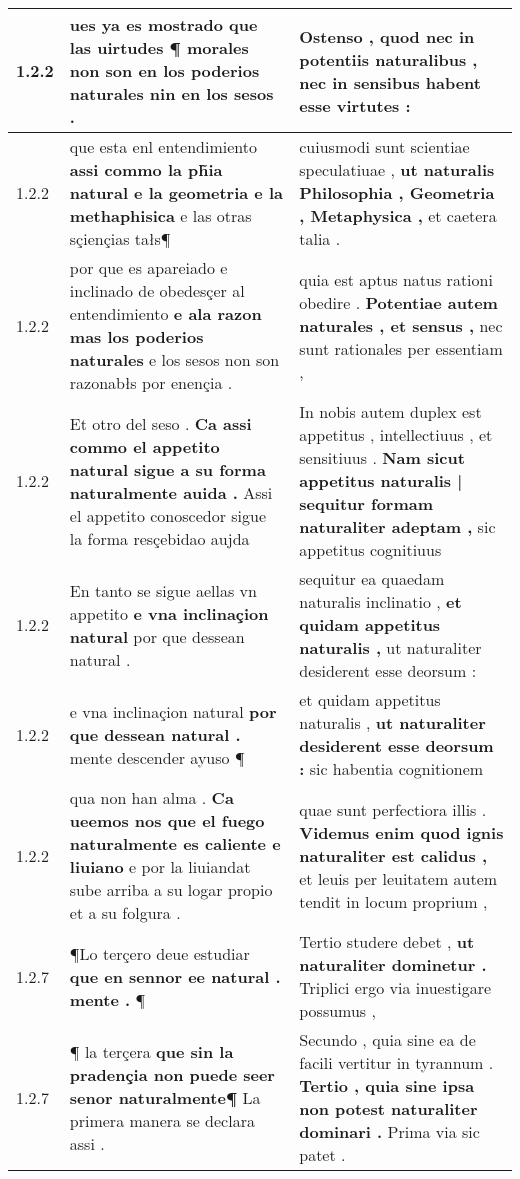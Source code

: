 \begin{tabular}{|p{1cm}|p{6.5cm}|p{6.5cm}|}
1.2.2 & ues ya es mostrado \textbf{ que las uirtudes ¶ morales non son en los poderios naturales } nin en los sesos . & Ostenso , \textbf{ quod nec in potentiis naturalibus , } nec in sensibus habent esse virtutes : \\\hline
1.2.2 & que esta enl entendimiento \textbf{ assi commo la ph̃ia natural e la geometria e la methaphisica } e las otras sçiençias tałs¶ & cuiusmodi sunt scientiae speculatiuae , \textbf{ ut naturalis Philosophia , Geometria , Metaphysica , } et caetera talia . \\\hline
1.2.2 & por que es apareiado e inclinado de obedesçer al entendimiento \textbf{ e ala razon mas los poderios naturales } e los sesos non son razonabłs por enençia . & quia est aptus natus rationi obedire . \textbf{ Potentiae autem naturales , et sensus , } nec sunt rationales per essentiam , \\\hline
1.2.2 & Et otro del seso . \textbf{ Ca assi commo el appetito natural sigue a su forma naturalmente auida . } Assi el appetito conoscedor sigue la forma resçebidao aujda & In nobis autem duplex est appetitus , intellectiuus , et sensitiuus . \textbf{ Nam sicut appetitus naturalis | sequitur formam naturaliter adeptam , } sic appetitus cognitiuus \\\hline
1.2.2 & En tanto se sigue aellas vn appetito \textbf{ e vna inclinaçion natural } por que dessean natural . & sequitur ea quaedam naturalis inclinatio , \textbf{ et quidam appetitus naturalis , } ut naturaliter desiderent esse deorsum : \\\hline
1.2.2 & e vna inclinaçion natural \textbf{ por que dessean natural . } mente descender ayuso ¶ & et quidam appetitus naturalis , \textbf{ ut naturaliter desiderent esse deorsum : } sic habentia cognitionem \\\hline
1.2.2 & qua non han alma . \textbf{ Ca ueemos nos que el fuego naturalmente es caliente e liuiano } e por la liuiandat sube arriba a su logar propio et a su folgura . & quae sunt perfectiora illis . \textbf{ Videmus enim quod ignis naturaliter est calidus , } et leuis per leuitatem autem tendit in locum proprium , \\\hline
1.2.7 & ¶Lo terçero deue estudiar \textbf{ que en sennor ee natural . mente . } ¶ & Tertio studere debet , \textbf{ ut naturaliter dominetur . } Triplici ergo via inuestigare possumus , \\\hline
1.2.7 & ¶ la terçera \textbf{ que sin la pradençia non puede seer senor naturalmente¶ } La primera manera se declara assi . & Secundo , quia sine ea de facili vertitur in tyrannum . \textbf{ Tertio , quia sine ipsa non potest naturaliter dominari . } Prima via sic patet . \\\hline

\end{tabular}

